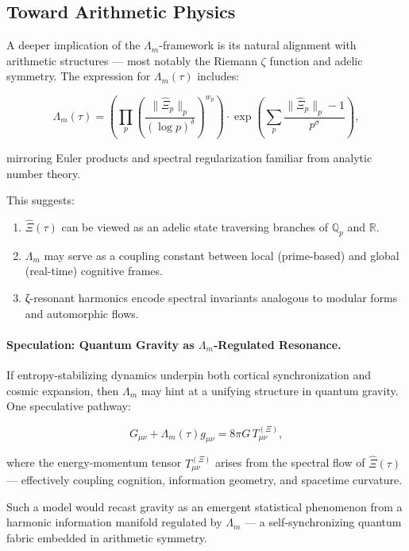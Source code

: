 \documentclass{article}
\theoremstyle{plain}
\theoremstyle{claimstyle}
\begin{document}
\subsection{Toward Arithmetic Physics}

A deeper implication of the $\Lambda_m$-framework is its natural alignment with arithmetic structures — most notably the Riemann $\zeta$ function and adelic symmetry. The expression for $\Lambda_m(\tau)$ includes:

\begin{equation}
\Lambda_m(\tau) = \left( \prod_p \left( \frac{\|\hat{\Xi}_p\|_p}{(\log p)^\delta} \right)^{w_p} \right) \cdot \exp \left( \sum_p \frac{\|\hat{\Xi}_p\|_p - 1}{p^\sigma} \right),
\end{equation}

mirroring Euler products and spectral regularization familiar from analytic number theory.

This suggests:

\begin{enumerate}
    \item $\hat{\Xi}(\tau)$ can be viewed as an adelic state traversing branches of $\mathbb{Q}_p$ and $\mathbb{R}$.
    \item $\Lambda_m$ may serve as a coupling constant between local (prime-based) and global (real-time) cognitive frames.
    \item ζ-resonant harmonics encode spectral invariants analogous to modular forms and automorphic flows.
\end{enumerate}

\paragraph{Speculation: Quantum Gravity as $\Lambda_m$-Regulated Resonance.}

If entropy-stabilizing dynamics underpin both cortical synchronization and cosmic expansion, then $\Lambda_m$ may hint at a unifying structure in quantum gravity. One speculative pathway:

\begin{equation}
G_{\mu\nu} + \Lambda_m(\tau) g_{\mu\nu} = 8\pi G \, T_{\mu\nu}^{(\Xi)},
\end{equation}

where the energy-momentum tensor $T_{\mu\nu}^{(\Xi)}$ arises from the spectral flow of $\hat{\Xi}(\tau)$ — effectively coupling cognition, information geometry, and spacetime curvature.

Such a model would recast gravity as an emergent statistical phenomenon from a harmonic information manifold regulated by $\Lambda_m$ — a self-synchronizing quantum fabric embedded in arithmetic symmetry.
\end{document}
